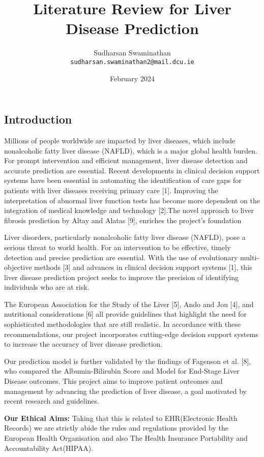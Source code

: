 \documentclass{article}
\title{Literature Review for Liver Disease Prediction}
\author{Sudharsan Swaminathan \\ \texttt{sudharsan.swaminathan2@mail.dcu.ie}}
\date{February 2024}
\begin{document}
\maketitle
\begin{multicols}{2}
\section{Introduction}
Millions of people worldwide are impacted by liver diseases, which include nonalcoholic fatty liver disease (NAFLD), which is a major global health burden. For prompt intervention and efficient management, liver disease detection and accurate prediction are essential. Recent developments in clinical decision support systems have been essential in automating the identification of care gaps for patients with liver diseases receiving primary care [1]. Improving the interpretation of abnormal liver function tests has become more dependent on the integration of medical knowledge and technology [2].The novel approach to liver fibrosis prediction by Altay and Alatas [9], enriches the project's foundation

Liver disorders, particularly nonalcoholic fatty liver disease (NAFLD), pose a serious threat to world health. For an intervention to be effective, timely detection and precise prediction are essential. With the use of evolutionary multi-objective methods [3] and advances in clinical decision support systems [1], this liver disease prediction project seeks to improve the precision of identifying individuals who are at risk.

\vspace{20pt}

The European Association for the Study of the Liver [5], Ando and Jou [4], and nutritional considerations [6] all provide guidelines that highlight the need for sophisticated methodologies that are still realistic. In accordance with these recommendations, our project incorporates cutting-edge decision support systems to increase the accuracy of liver disease prediction.

Our prediction model is further validated by the findings of Fagenson et al. [8], who compared the Albumin-Bilirubin Score and Model for End-Stage Liver Disease outcomes. This project aims to improve patient outcomes and management by advancing the prediction of liver disease, a goal motivated by recent research and guidelines.

\textbf{Our Ethical Aims:}
Taking that this is related to EHR(Electronic Health Records) we are strictly abide the rules and regulations provided by the European Health Organisation and also The Health Insurance Portability and Accountability Act(HIPAA).


\end{multicols}
\end{document}
